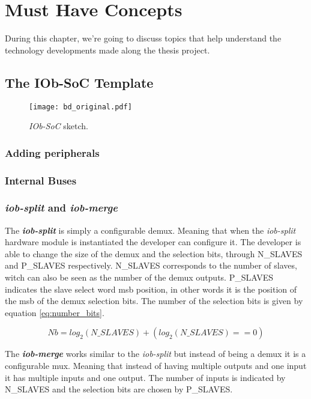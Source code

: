 \chapter{Must Have Concepts}
During this chapter, we're going to discuss topics that help understand the technology developments made along the thesis project.

\section{The IOb-SoC Template}
\label{section:the_iob_soc_template}

\begin{figure}[!h]
    \centering
    \texttt{[image: bd\_original.pdf]}
    \caption{\textit{IOb-SoC} sketch.}
    \label{fig:bd_original}
\end{figure}

\subsection{Adding peripherals}
\subsection{Internal Buses}
\subsection{\textit{iob-split} and \textit{iob-merge}}
The \textbf{\textit{iob-split}} is simply a configurable \acrfull{demux}. Meaning that when the \textit{iob-split} hardware module is instantiated the developer can configure it. The developer is able to change the size of the \acrlong{demux} and the selection bits, through N\_SLAVES and P\_SLAVES respectively. N\_SLAVES corresponds to the number of slaves, witch can also be seen as the number of the \acrshort{demux} outputs. P\_SLAVES indicates the slave select word \acrfull{msb} position, in other words it is the position of the \acrshort{msb} of the \acrlong{demux} selection bits. The number of the selection bits is given by equation \ref{eq:number_bits}.

\begin{equation}
    \label{eq:number_bits}
    Nb = log_2(N\_SLAVES)+(log_2(N\_SLAVES)==0)
\end{equation}

The \textbf{\textit{iob-merge}} works similar to the \textit{iob-split} but instead of being a \acrshort{demux} it is a configurable \acrfull{mux}. Meaning that instead of having multiple outputs and one input it has multiple inputs and one output. The number of inputs is indicated by N\_SLAVES and the selection bits are chosen by P\_SLAVES.

